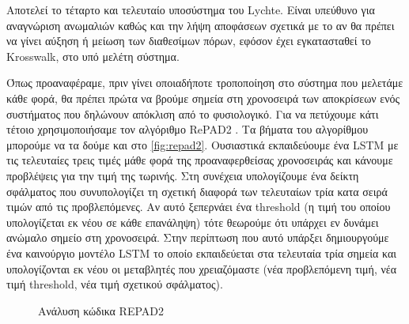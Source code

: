 Αποτελεί το τέταρτο και τελευταίο υποσύστημα του Lychte. Είναι υπεύθυνο για αναγνώριση ανωμαλιών καθώς και την λήψη αποφάσεων σχετικά με το αν θα πρέπει να γίνει αύξηση ή μείωση των διαθεσίμων πόρων, εφόσον έχει εγκατασταθεί το Krosswalk, στο υπό μελέτη σύστημα.

Όπως προαναφέραμε, πριν γίνει οποιαδήποτε τροποποίηση στο σύστημα που μελετάμε κάθε φορά, θα πρέπει πρώτα να βρούμε σημεία στη χρονοσειρά των αποκρίσεων ενός συστήματος που δηλώνουν απόκλιση από το φυσιολογικό. Για να πετύχουμε κάτι τέτοιο χρησιμοποιήσαμε τον αλγόριθμο RePAD2 \cite{lee2023repad2}. Τα βήματα του αλγορίθμου μπορούμε να τα δούμε και στο \autoref{fig:repad2}. Ουσιαστικά εκπαιδεύουμε ένα LSTM με τις τελευταίες τρεις τιμές μάθε φορά της προαναφερθείσας χρονοσειράς και κάνουμε προβλέψεις για την τιμή της τωρινής. Στη συνέχεια υπολογίζουμε ένα δείκτη σφάλματος που συνυπολογίζει τη σχετική διαφορά των τελευταίων τρία κατα σειρά τιμών από τις προβλεπόμενες. Αν αυτό ξεπερνάει ένα threshold (η τιμή του οποίου υπολογίζεται εκ νέου σε κάθε επανάληψη) τότε θεωρούμε ότι υπάρχει εν δυνάμει ανώμαλο σημείο στη χρονοσειρά. Στην περίπτωση που αυτό υπάρξει δημιουργούμε ένα καινούργιο μοντέλο LSTM το οποίο εκπαιδεύεται στα τελευταία τρία σημεία και υπολογίζονται εκ νέου οι μεταβλητές που χρειαζόμαστε (νέα προβλεπόμενη τιμή, νέα τιμή threshold, νέα τιμή σχετικού σφάλματος).

\begin{figure}[!ht]
	\centering
	\caption[Ανάλυση κώδικα REPAD2]{Ανάλυση κώδικα REPAD2}
	\label{fig:repad2}
\end{figure}

